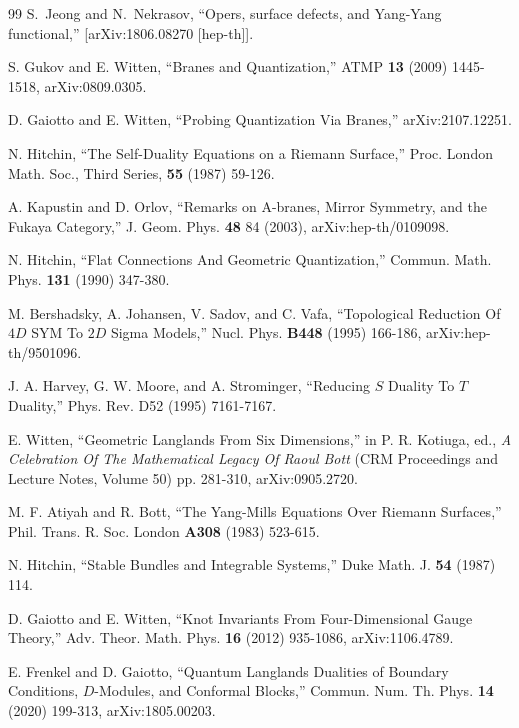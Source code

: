 \documentclass[11pt,a4paper]{article}
\begin{document}
\begin{thebibliography}{99}
S.~Jeong and N.~Nekrasov,
``Opers, surface defects, and Yang-Yang functional,''
[arXiv:1806.08270 [hep-th]].



S. Gukov and E. Witten, ``Branes and Quantization,'' ATMP {\bf 13} (2009) 1445-1518, arXiv:0809.0305.

 D. Gaiotto and E. Witten, ``Probing Quantization Via Branes,'' arXiv:2107.12251.

N. Hitchin, ``The Self-Duality Equations on a Riemann Surface,'' Proc. London Math. Soc., Third Series, {\bf 55} (1987) 59-126.



A. Kapustin and D. Orlov, ``Remarks on A-branes, Mirror Symmetry, and the Fukaya
Category,'' J. Geom. Phys. {\bf 48} 84 (2003), arXiv:hep-th/0109098.

  N. Hitchin, ``Flat Connections And Geometric Quantization,'' Commun. Math. Phys. {\bf 131} (1990) 347-380.



  M. Bershadsky, A. Johansen, V. Sadov, and C. Vafa, ``Topological Reduction Of $4  D$ SYM To $2  D$ Sigma Models,'' Nucl. Phys. {\bf B448} (1995) 166-186, arXiv:hep- th/9501096.
 
 J. A. Harvey, G. W. Moore, and A. Strominger, ``Reducing $S$ Duality To $T$ Duality,'' Phys. Rev. D52 (1995) 7161-7167.

E. Witten, ``Geometric Langlands From Six Dimensions,'' in P. R. Kotiuga, ed., {\it A Celebration Of The Mathematical Legacy Of Raoul Bott} 
(CRM Proceedings and Lecture Notes, Volume 50) pp. 281-310, arXiv:0905.2720.

M. F. Atiyah and R. Bott, ``The Yang-Mills Equations Over Riemann Surfaces,'' Phil. Trans.  R. Soc. London {\bf A308} (1983) 523-615.

 N. Hitchin, ``Stable Bundles and Integrable Systems,'' Duke Math. J. {\bf 54} (1987) 114.

 D. Gaiotto and E. Witten, ``Knot Invariants From Four-Dimensional Gauge Theory,'' Adv. Theor. Math. Phys. {\bf 16} (2012) 935-1086,  arXiv:1106.4789.

E. Frenkel and D. Gaiotto, ``Quantum Langlands Dualities of Boundary Conditions, $D$-Modules, and Conformal Blocks,'' Commun. Num. Th. Phys.
{\bf 14} (2020) 199-313, arXiv:1805.00203.



\end{thebibliography}
\end{document}

